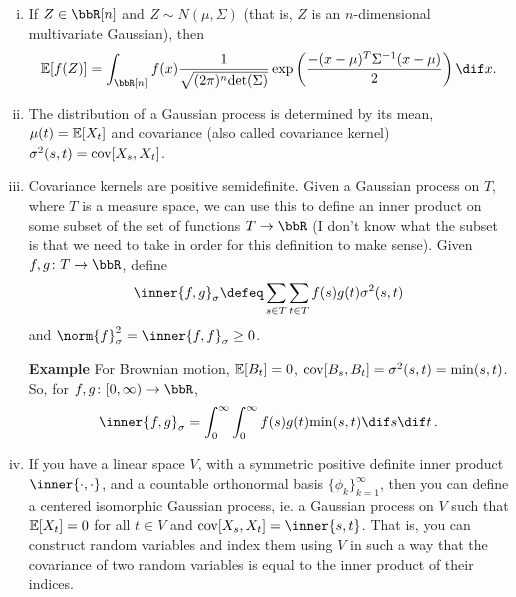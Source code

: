 \documentclass[../../../Master/AppliedStochastics.tex]{subfiles}
\begin{document}
\begin{enumerate}[(i)]
    \item
    If $Z \in \bbR[n]$ and $Z \sim N(\mu,\Sigma)$
        (that is, $Z$ is an $n$-dimensional multivariate Gaussian),
        then
    \begin{equation*}
        \E[f(Z)] = \int_{\bbR[n]}
            f(x) \dfrac{1}{\sqrt{(2\pi)^n \mathrm{det}(\Sigma)}}
            \exp\left(\dfrac{- (x - \mu)^T \Sigma^{-1} (x - \mu)}{2}\right)
                \dif x.
    \end{equation*}
    
    \item
    The distribution of a Gaussian process is determined by its mean, 
        $\mu(t)=\mathbb{E}[X_t]$ and covariance
            (also called covariance kernel) $\sigma^2(s, t) = \operatorname{cov}[X_s, X_t]$.
    
    \item
    Covariance kernels are positive semidefinite.
    Given a Gaussian process on $T$, where $T$ is a measure space,
        we can use this to define an inner product on some subset of
            the set of functions $T \to \bbR$
    (I don't know what the subset is that we need to take
        in order for this definition to make sense).
    Given $f, g \colon T \to \bbR$, define
    \begin{equation*}
        \inner{f, g}_{\sigma} \defeq \sum_{s \in T} \sum_{t \in T}
            f(s) g(t) \sigma^2(s, t)
    \end{equation*}
        and $\norm{f}_\sigma^2 = \inner{f, f}_\sigma \geq 0$.
    
    
    \textbf{Example}
    For Brownian motion,
        $\mathbb{E}[B_t]=0$, $\operatorname{cov}[B_s, B_t] = \sigma^2(s, t) = \mathrm{min}(s, t)$.
    So, for $f, g \colon [0, \infty) \to \bbR$,
    \begin{equation*}
        \inner{f, g}_\sigma = \int_0^\infty \int_0^\infty
            f(s) g(t) \mathrm{min}(s, t) \dif s \dif t\,.
    \end{equation*}


    \item
    If you have a linear space $V$,
        with a symmetric positive definite inner product $\inner{\cdot, \cdot}$,
        and a countable orthonormal basis $\{\phi_k\}_{k = 1}^{\infty}$,
            then you can define a centered isomorphic Gaussian process,
            ie. a Gaussian process on $V$ such that $\mathbb{E}[X_t] = 0$
                for all $t \in V$ and $\cov[X_s, X_t] = \inner{s, t}$.
    That is, you can construct random variables
        and index them using $V$ in such a way that
        the covariance of two random variables is equal to
        the inner product of their indices.



\end{enumerate}
\end{document}

